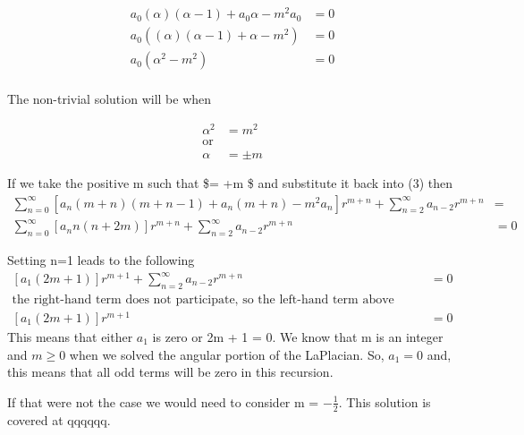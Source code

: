 \documentclass[11pt]{article}
\begin{document}
\begin{equation}
\begin{split}
a_{0} (\alpha) (\alpha - 1)  + a_{0} \alpha - m^2 a_0 &= 0 \\
a_{0} \left((\alpha) (\alpha - 1)  + \alpha - m^2 \right) &= 0 \\
a_{0} \left(\alpha^{2} - m^2 \right) &= 0 \\
\end{split}
\end{equation}

The non-trivial solution will be when

\begin{equation}
\begin{split}
\alpha^{2} &= m^{2} \\
\text{or} \\
\alpha &= \pm m
\end{split}
\end{equation}

If we take the positive m such that \$\alpha = +m \$ and substitute it
back into (3) then \begin{equation}
\begin{split}
\sum_{n=0}^{\infty} \left[ a_{n} (m + n) (m + n - 1)  +
a_{n} (m + n) - m^2 a_n  \right] r^{m + n} + \sum_{n=2}^{\infty}{a_{n-2} r^{m + n}} &= \\
\sum_{n=0}^{\infty} \left[ a_{n} n(n + 2m) \right] r^{m + n} + \sum_{n=2}^{\infty}{a_{n-2} r^{m + n}} &= 0 
\end{split}
\end{equation}

Setting n=1 leads to the following \begin{equation}
\begin{split}
\left[ a_{1} (2m + 1) \right] r^{m + 1} + \sum_{n=2}^{\infty}{a_{n-2} r^{m + n}} &= 0 \\
\text{the right-hand term does not participate, so the left-hand term above must be zero} \\
\left[ a_{1} (2m + 1) \right] r^{m + 1}  &= 0
\end{split}
\end{equation} This means that either \(a_{1}\) is zero or 2m + 1 = 0.
We know that m is an integer and \(m \geq 0\) when we solved the angular
portion of the LaPlacian. So, \(a_{1} = 0\) and, this means that all odd
terms will be zero in this recursion.

If that were not the case we would need to consider m =
\(-\frac{1}{2}\). This solution is covered at qqqqqq.
\end{document}
